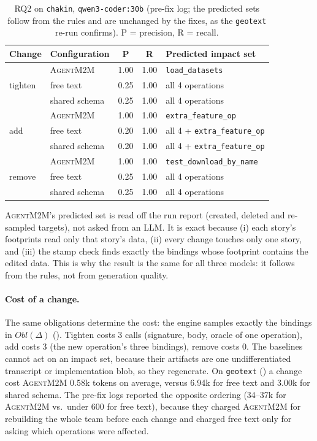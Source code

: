 \documentclass[10pt,a4paper]{article}
\newcommand{\tool}{\textsc{AgentM2M}}
\newcommand{\Obl}{\mathit{Obl}}
\newcommand{\code}[1]{\texttt{#1}}
\theoremstyle{definition}
\begin{document}
\begin{table}[h]
\centering\small
\caption{RQ2 on \texttt{chakin}, \texttt{qwen3-coder:30b} (pre-fix log; the predicted sets follow from the rules and are unchanged by the fixes, as the \texttt{geotext} re-run confirms). P = precision, R = recall.}
\label{tab:rq2}
\begin{tabular}{@{}l l c c l@{}}
\toprule
Change & Configuration & P & R & Predicted impact set \\
\midrule
\multirow{3}{*}{tighten} & \tool{} & 1.00 & 1.00 & \code{load_datasets} \\
 & free text & 0.25 & 1.00 & all 4 operations \\
 & shared schema & 0.25 & 1.00 & all 4 operations \\
\midrule
\multirow{3}{*}{add} & \tool{} & 1.00 & 1.00 & \code{extra_feature_op} \\
 & free text & 0.20 & 1.00 & all 4 + \code{extra_feature_op} \\
 & shared schema & 0.20 & 1.00 & all 4 + \code{extra_feature_op} \\
\midrule
\multirow{3}{*}{remove} & \tool{} & 1.00 & 1.00 & \code{test_download_by_name} \\
 & free text & 0.25 & 1.00 & all 4 operations \\
 & shared schema & 0.25 & 1.00 & all 4 operations \\
\bottomrule
\end{tabular}
\end{table}

\tool{}'s predicted set is read off the run report (created, deleted and
re-sampled targets), not asked from an LLM. It is exact because
(i) each story's footprints read only that story's data, (ii) every change
touches only one story, and (iii) the stamp check finds exactly the bindings
whose footprint contains the edited data. This is why the result is the same
for all three models: it follows from the rules, not from generation quality.

\paragraph{Cost of a change.} The same obligations determine the cost: the
engine samples exactly the bindings in $\Obl(\Delta)$ ().
Tighten costs 3 calls (signature, body, oracle of one operation), add costs
3 (the new operation's three bindings), remove costs 0. The baselines cannot
act on an impact set, because their artifacts are one undifferentiated
transcript or implementation blob, so they regenerate. On \texttt{geotext}
() a change cost \tool{} 0.58k tokens on average, versus
6.94k for free text and 3.00k for shared schema. The pre-fix logs reported
the opposite ordering (34--37k for \tool{} vs.\ under 600 for free text),
because they charged \tool{} for rebuilding the whole team before each change
and charged free text only for asking which operations were affected.
\end{document}
